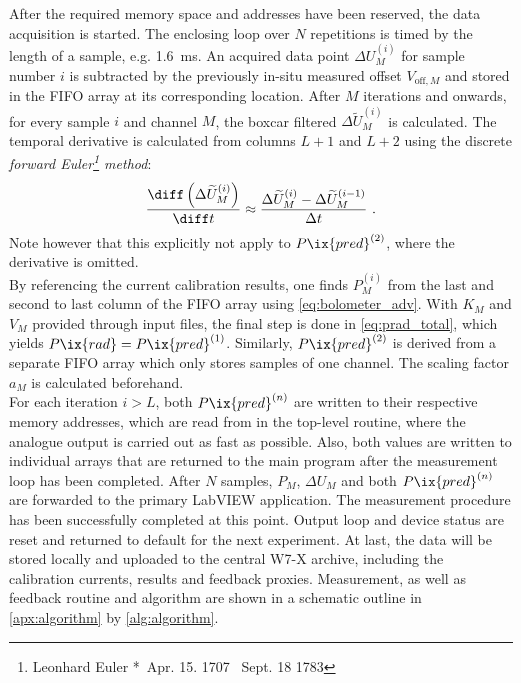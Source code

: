             After the required memory space and addresses have been reserved, the data acquisition is started. The enclosing loop over $N$ repetitions is timed by the length of a sample, e.g. \SI{1.6}{\milli\second}. An acquired data point $\Delta U_{M}^{\left(i\right)}$ for sample number $i$ is subtracted by the previously in-situ measured offset $V_{\text{off}, M}$ and stored in the FIFO array at its corresponding location. After $M$ iterations and onwards, for every sample $i$ and channel $M$, the boxcar filtered $\Delta\widetilde{U}_{M}^{\left(i\right)}$ is calculated. The temporal derivative is calculated from columns $L+1$ and $L+2$ using the discrete \textit{forward Euler\footnote[1]{Leonhard Euler *~Apr. 15. 1707 \textdagger~Sept. 18 1783} method}:%
%
            \begin{align}%
                \frac{\diff\left(\Delta\widetilde{U}_{M}^{\left(i\right)}\right)}{\diff t}\approx\frac{\Delta\widetilde{U}_{M}^{\left(i\right)}-\Delta\widetilde{U}_{M}^{\left(i-1\right)}}{\Delta t}\,\,.\nonumber%
            \end{align}%
%
            Note however that this explicitly not apply to $P\ix{pred}^{\left(2\right)}$, where the derivative is omitted.\\%
            By referencing the current calibration results, one finds $P_{M}^{\left(i\right)}$ from the last and second to last column of the FIFO array using \cref{eq:bolometer_adv}. With $K_{M}$ and $V_{M}$ provided through input files, the final step is done in \cref{eq:prad_total}, which yields $P\ix{rad}=P\ix{pred}^{\left(1\right)}$. Similarly, $P\ix{pred}^{\left(2\right)}$ is derived from a separate FIFO array which only stores samples of one channel. The scaling factor $a_{M}$ is calculated beforehand.\\%
            For each iteration $i>L$, both $P\ix{pred}^{\left(n\right)}$ are written to their respective memory addresses, which are read from in the top-level routine, where the analogue output is carried out as fast as possible. Also, both values are written to individual arrays that are returned to the main program after the measurement loop has been completed. After $N$ samples, $P_{M}$, $\Delta U_{M}$ and both $P\ix{pred}^{\left(n\right)}$ are forwarded to the primary LabVIEW application. The measurement procedure has been successfully completed at this point. Output loop and device status are reset and returned to default for the next experiment. At last, the data will be stored locally and uploaded to the central W7-X archive, including the calibration currents, results and feedback proxies. Measurement, as well as feedback routine and algorithm are shown in a schematic outline in \cref{apx:algorithm} by \autoref{alg:algorithm}.%
%
